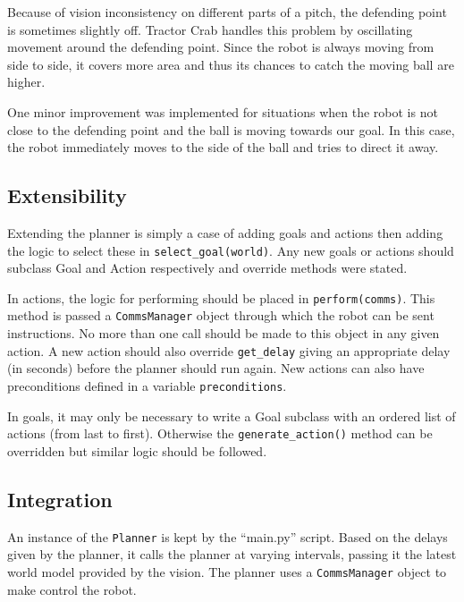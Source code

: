 Because of vision inconsistency on different parts of a pitch, the defending point is sometimes slightly off. Tractor Crab handles this problem by oscillating movement around the defending point. Since the robot is always moving from side to side, it covers more area and thus its chances to catch the moving ball are higher.

One minor improvement was implemented for situations when the robot is not close to the defending point and the ball is moving towards our goal. In this case, the robot immediately moves to the side of the ball and tries to direct it away.

\subsection{Extensibility}

Extending the planner is simply a case of adding goals and actions then adding
the logic to select these in \texttt{select\_goal(world)}. Any new goals or
actions should subclass Goal and Action respectively and override methods were
stated.

In actions, the logic for performing should be placed in
\texttt{perform(comms)}. This method is passed a \texttt{CommsManager} object
through which the robot can be sent instructions. No more than one call should
be made to this object in any given action. A new action should also override
\texttt{get\_delay} giving an appropriate delay (in seconds) before the planner
should run again. New actions can also have preconditions defined in a variable
\texttt{preconditions}.

In goals, it may only be necessary to write a Goal subclass with an ordered
list of actions (from last to first). Otherwise the \texttt{generate\_action()}
method can be overridden but similar logic should be followed.

\subsection{Integration}

An instance of the \texttt{Planner} is kept by the ``main.py'' script. Based on
the delays given by the planner, it calls the planner at varying intervals,
passing it the latest world model provided by the vision. The planner uses a
\texttt{CommsManager} object to make control the robot.
